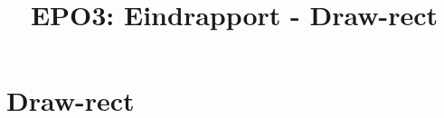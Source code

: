 \documentclass{scrartcl} %
\author{}
\title{EPO3: Eindrapport - Draw-rect}
\begin{document}
\section{Draw-rect}
\label{sec:draw-rect}
\end{document}
